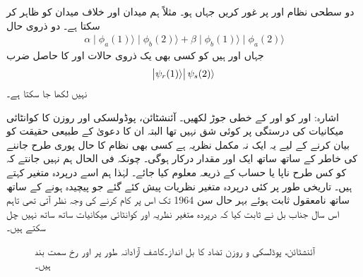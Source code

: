 دو سطحی  نظام  اور  پر غور کریں جہاں  ہو۔ مثلاً  ہم میدان اور  خلاف میدان کو ظاہر کر سکتا ہے۔ دو ذروی حال 
\begin{align*}
	\alpha\mid\phi_a(1)\rangle\mid\phi_b(2)\rangle+\beta\mid\phi_b(1)\rangle\mid\phi_a(2)\rangle
\end{align*}
جہاں  اور  ہیں کو کسی بھی یک ذروی حالات  اور  کا حاصل ضرب
\begin{align*}
	\abs{\psi_r(1)\rangle}\psi_s(2)\rangle
\end{align*}
نہیں لکھا جا سکتا ہے۔

اشارہ:  اور  کو  اور  کے خطی جوڑ لکھیں۔
آئنشٹائن، پوڈولسکی اور روزن کا کوانٹائی میکانیات کی درستگی پر کوئی شق نہیں تھا البتہ ان کا دعویٰ کے طبیعی حقیقت کو بیان کرنے کے لیے یہ ایک نہ مکمل نظریہ ہے کسی بھی نظام کا حال پوری طرح جاننے کی خاطر  کے ساتھ ساتھ ایک اور مقدار  درکار ہوگی۔ چونکہ فی الحال ہم نہیں جانتے کہ  کو کس طرح ناپا یا حساب کے ذریعہ معلوم کیا جائے۔ لہٰذا ہم اسے درپردہ متغیر کہتے ہیں۔ تاریخی طور پر کئی درپردہ متغیر نظریات پیش کئے گئے جو پیچیدہ ہونے کے ساتھ ساتھ نامعقول ثابت ہوئے بہر حال سن \num{1964} تک اس پر کام کرنے کی وجہ نظر آتی تھی تاہم اس سال جناب بل نے ثابت کیا کہ درپردہ متغیر نظریہ اور کوانٹائی میکانیات ساتھ ساتھ نہیں چل سکتے ہیں۔

\begin{figure}
\centering
{}
\caption{آئنشٹائن، پوڈلسکی و  روزن  تضاد کا بل  انداز۔کاشف آزادانہ طور پر  اور  رخ سمت بند ہیں۔}
\label{شکل_بکھراو_بل_انداز}
\end{figure}



